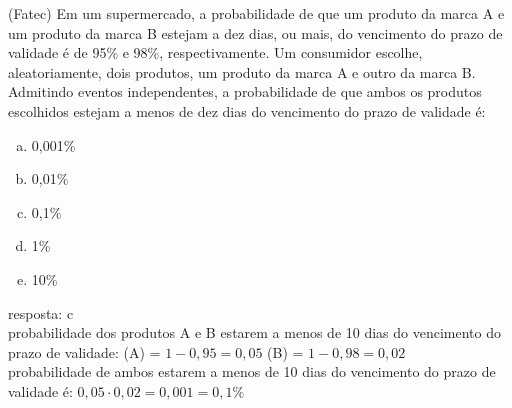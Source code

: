 \begin{ex}
   (Fatec) Em um supermercado, a probabilidade de que um produto da marca A e um produto da marca B estejam a dez dias, ou mais, do vencimento do prazo de validade é de 95\% e 98\%, respectivamente. Um consumidor escolhe, aleatoriamente, dois produtos, um produto da marca A e outro da marca B. Admitindo eventos independentes, a probabilidade de que ambos os produtos escolhidos estejam a menos de dez dias do vencimento do prazo de validade é:
     \begin{enumerate} [(a)]
         \item 0,001\%
         \item 0,01\%
         \item 0,1\%
         \item 1\%
         \item 10\%
     \end{enumerate}
      \begin{sol}
       resposta: c \\
       probabilidade dos produtos A e B estarem a menos de 10 dias do vencimento do prazo de validade:  (A) = $1-0,95=0,05$\hspace{0,5cm} (B) = $1-0,98=0,02$\\
       probabilidade de ambos estarem a menos de 10 dias do vencimento do prazo de validade é: \hspace{0,3cm} $0,05\cdot0,02=0,001=0,1\%$
      \end{sol}
  \end{ex}